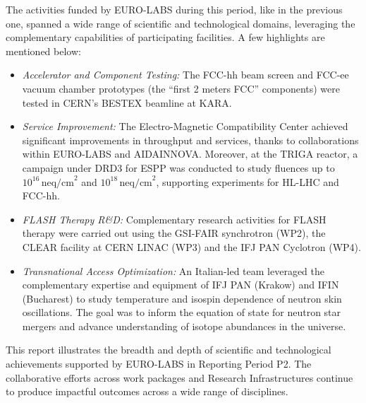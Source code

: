 The activities funded by EURO-LABS during this period, like in the previous one, spanned a wide range of scientific and technological domains, leveraging the complementary capabilities of participating facilities. A few highlights are mentioned below: 



\begin{itemize}
    \item {\it Accelerator and Component Testing:} The FCC-hh beam screen and FCC-ee vacuum chamber prototypes (the ``first 2 meters FCC'' components) were tested in CERN's BESTEX beamline at KARA.
    
    \item {\it Service Improvement:} The Electro-Magnetic Compatibility Center achieved significant improvements in throughput and services, thanks to collaborations within EURO-LABS and AIDAINNOVA. Moreover, at the TRIGA reactor, a campaign under DRD3 for ESPP  was conducted to study fluences up to \(10^{16} \, \text{neq/cm}^2\) and \(10^{18} \, \text{neq/cm}^2\), supporting experiments for HL-LHC and FCC-hh.
    
    \item {\it FLASH Therapy R\&D:} Complementary research activities for FLASH therapy were carried out using
        the GSI-FAIR synchrotron (WP2),
        the CLEAR facility at CERN LINAC (WP3)
        and the IFJ PAN Cyclotron (WP4).
    
    \item {\it Transnational Access Optimization:} An Italian-led team leveraged the complementary expertise and equipment of IFJ PAN (Krakow) and IFIN (Bucharest) to study temperature and isospin dependence of neutron skin oscillations. The goal was to inform the equation of state for neutron star mergers and advance understanding of isotope abundances in the universe.
\end{itemize}



This report illustrates the breadth and depth of scientific and technological achievements supported by EURO-LABS in Reporting Period P2. The collaborative efforts across work packages and Research Infrastructures continue to produce impactful outcomes across a wide range of disciplines.



